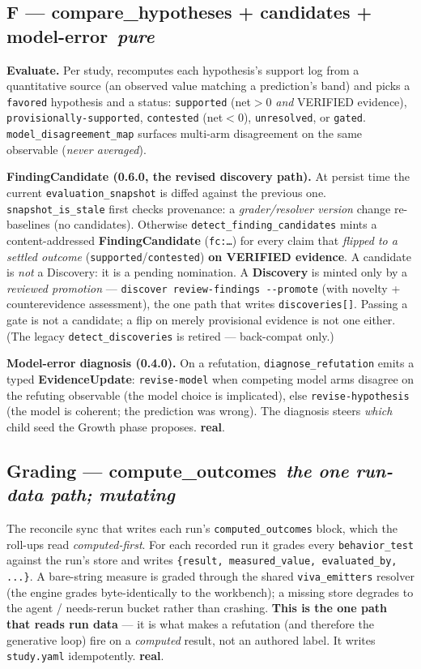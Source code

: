 \documentclass[11pt]{article}
\newcommand{\code}[1]{\texttt{\small #1}}
\newcommand{\real}{\textcolor{good}{\textbf{real}}}
\newcommand{\stage}[2]{\subsection*{\textcolor{accent}{#1}\, \normalfont\textit{\small #2}}}
\begin{document}
\stage{F --- compare\_hypotheses + candidates + model-error}{pure}
\textbf{Evaluate.} Per study, recomputes each hypothesis's support log from a quantitative source
(an observed value matching a prediction's band) and picks a \code{favored} hypothesis and a
status: \code{supported} (net${>}0$ \emph{and} VERIFIED evidence), \code{provisionally-supported},
\code{contested} (net${<}0$), \code{unresolved}, or \code{gated}. \code{model\_disagreement\_map}
surfaces multi-arm disagreement on the same observable (\emph{never averaged}).

\noindent\textbf{FindingCandidate (0.6.0, the revised discovery path).} At persist time the current
\code{evaluation\_snapshot} is diffed against the previous one. \code{snapshot\_is\_stale} first
checks provenance: a \emph{grader/resolver version} change re-baselines (no candidates). Otherwise
\code{detect\_finding\_candidates} mints a content-addressed \textbf{FindingCandidate}
(\code{fc:\dots}) for every claim that \emph{flipped to a settled outcome}
(\code{supported}/\code{contested}) \textbf{on VERIFIED evidence}. A candidate is \emph{not} a
Discovery: it is a pending nomination. A \textbf{Discovery} is minted only by a \emph{reviewed
promotion} --- \code{discover review-findings -{}-promote} (with novelty + counterevidence
assessment), the one path that writes \code{discoveries[]}. Passing a gate is not a candidate; a
flip on merely provisional evidence is not one either. (The legacy \code{detect\_discoveries} is
retired --- back-compat only.)

\noindent\textbf{Model-error diagnosis (0.4.0).} On a refutation, \code{diagnose\_refutation}
emits a typed \textbf{EvidenceUpdate}: \code{revise-model} when competing model arms disagree on
the refuting observable (the model choice is implicated), else \code{revise-hypothesis} (the
model is coherent; the prediction was wrong). The diagnosis steers \emph{which} child seed the
Growth phase proposes. \real.

\stage{Grading --- compute\_outcomes}{the one run-data path; mutating}
The reconcile sync that writes each run's \code{computed\_outcomes} block, which the roll-ups read
\emph{computed-first}. For each recorded run it grades every \code{behavior\_test} against the
run's store and writes \code{\{result, measured\_value, evaluated\_by, ...\}}. A bare-string
measure is graded through the shared \code{viva\_emitters} resolver (the engine grades
byte-identically to the workbench); a missing store degrades to the agent / needs-rerun bucket
rather than crashing. \textbf{This is the one path that reads run data} --- it is what makes a
refutation (and therefore the generative loop) fire on a \emph{computed} result, not an authored
label. It writes \code{study.yaml} idempotently. \real.
\end{document}
